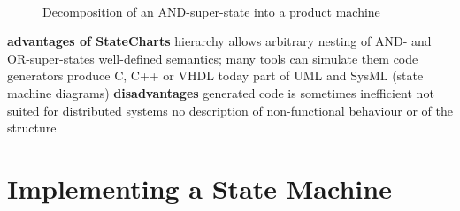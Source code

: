 \os{\newpage}

\begin{figure}[!hbtp]
     \begin{center}
	  \\
	  \caption{Decomposition of an AND-super-state into a product machine}
     \end{center}
\end{figure}
\os{\newpage}

\bi
	\ite \textbf{advantages of StateCharts}
	\bi
		\ite hierarchy allows arbitrary nesting of AND- and OR-super-states
		\ite well-defined semantics; many tools can simulate them
		\ite code generators produce C, C++ or VHDL
		\ite today part of UML and SysML (state machine diagrams)
	\ei
	\ite \textbf{disadvantages}
	\bi
		\ite generated code is sometimes inefficient
		\ite not suited for distributed systems
		\ite no description of non-functional behaviour or of the structure
	\ei
\ei
\os{\newpage}

\section{Implementing a State Machine}

